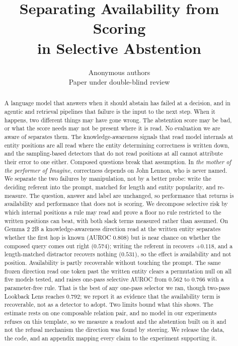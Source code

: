\documentclass{article}
\title{Separating Availability from Scoring\\ in Selective Abstention}
\author{Anonymous authors\\Paper under double-blind review}
\begin{document}
\maketitle

\begin{abstract}
A language model that answers when it should abstain has failed at a decision, and in agentic and
retrieval pipelines that failure is the input to the next step. When it happens, two different things may have
gone wrong. The abstention score may be bad, or what the score needs may not be present where it is
read. No evaluation we are aware of separates them. The knowledge-awareness signals that read model
internals at entity positions are all read where the entity determining correctness is written down,
and the sampling-based detectors that do not read positions at all cannot attribute their error to one
either. Composed questions break that
assumption. In \emph{the mother of the performer of Imagine}, correctness depends on John Lennon, who
is never named. We separate the two failures by manipulation, not by a better probe: write the deciding
referent into the prompt, matched for length and entity popularity, and re-measure. The
question, answer and label are unchanged, so performance that returns is availability and performance
that does not is scoring. We decompose selective risk by which internal positions a rule may read and
prove a floor no rule restricted to the written positions can beat, with both slack terms measured
rather than assumed. On Gemma 2 2B a knowledge-awareness direction read at the written entity
separates whether the first hop is known (AUROC $0.808$) but is near chance on whether the composed
query comes out right ($0.574$); writing the referent in recovers $+0.118$, and a length-matched
distractor recovers nothing ($0.531$), so the effect is availability and not position. Availability is partly
recoverable without touching the prompt. The same frozen direction read one token past the written
entity clears a permutation null on all five models tested, and raises one-pass selective AUROC from
$0.562$ to $0.766$ with a parameter-free rule. That is the best of any one-pass selector we ran,
though two-pass Lookback Lens reaches $0.792$; we report it as evidence that the availability term is
recoverable, not as a detector to adopt. Two limits bound what this shows. The estimate rests on one composable
relation pair, and no model in our experiments refuses on this template, so we measure a readout and
the abstention built on it and not the refusal mechanism the direction was found by steering. We
release the data, the code, and an appendix mapping every claim to the experiment supporting it.
\end{abstract}
\end{document}
